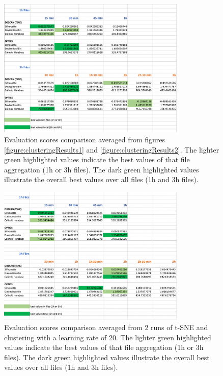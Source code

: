\begin{figure}[H]
  \centering
  \includegraphics[width=0.8\textwidth]{./images/clusteringResults/clusteringResults3.png}
  \caption{Evaluation scores comparison averaged from figures \ref{figure:clusteringResults1} and \ref{figure:clusteringResults2}. The lighter green highlighted values indicate the best values of that file aggregation (1h or 3h files). The dark green highlighted values illustrate the overall best values over all files (1h and 3h files).}
  \label{figure:clusteringResults3}
\end{figure}

\begin{figure}[H]
  \centering
  \includegraphics[width=0.8\textwidth]{./images/clusteringResults/clusteringResults4.png}
  \caption{Evaluation scores comparison averaged from 2 runs of t-SNE and clustering with a learning rate of 20. The lighter green highlighted values indicate the best values of that file aggregation (1h or 3h files). The dark green highlighted values illustrate the overall best values over all files (1h and 3h files).}
  \label{figure:clusteringResults4}
\end{figure}

